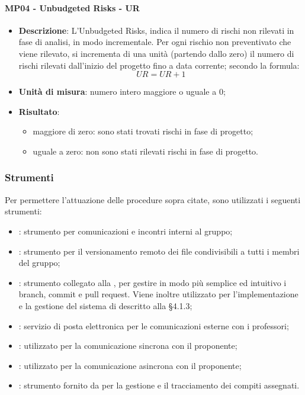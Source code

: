  		\paragraph{MP04 - Unbudgeted Risks - UR}
 		\begin{itemize}
 			\item \textbf{Descrizione}:
 			L'Unbudgeted Risks, indica il numero di rischi non rilevati in fase di analisi, in modo incrementale. Per ogni rischio non preventivato che viene rilevato, si incrementa di una unità (partendo dallo zero) il numero di rischi rilevati dall'inizio del progetto fino a data corrente; secondo la formula:
 			\begin{displaymath}
 				UR = UR + 1
 			\end{displaymath}
 			\item \textbf{Unità di misura}: numero intero maggiore o uguale a 0;
 			\item \textbf{Risultato}:
 			\begin{itemize}
 				\item maggiore di zero: sono stati trovati rischi in fase di progetto;
 				\item uguale a zero: non sono stati rilevati rischi in fase di progetto. \\
 			\end{itemize}
 		\end{itemize}

 	\subsubsection{Strumenti}
 	Per permettere l'attuazione delle procedure sopra citate, sono utilizzati i seguenti strumenti:
 	\begin{itemize}
 		\item \textbf{}: strumento per comunicazioni e incontri interni al gruppo;
 		\item \textbf{}: strumento per il versionamento remoto dei file condivisibili a tutti i membri del gruppo;
 		\item \textbf{}: strumento collegato alla  , per gestire in modo più semplice ed intuitivo i branch, commit e pull request. Viene inoltre utilizzato per l'implementazione e la gestione del sistema di  descritto alla §4.1.3;
 		\item \textbf{}: servizio di posta elettronica per le comunicazioni esterne con i professori;
        \item \textbf{}: utilizzato per la comunicazione sincrona con il proponente;
        \item \textbf{}: utilizzato per la comunicazione asincrona con il proponente;
 		\item {\bfseries {}}: strumento fornito da  per la gestione e il tracciamento dei compiti assegnati.
 	\end{itemize}
